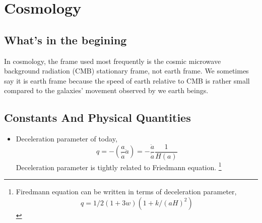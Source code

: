 \documentclass[11pt]{book}
\begin{document}
\chapter{Cosmology}


\section{What's in the begining}

In cosmology, the frame used most frequently is the cosmic microwave background radiation (CMB) stationary frame,  not earth frame. We sometimes say it is earth frame because the speed of earth relative to CMB is rather small compared to the galaxies' movement observed by we earth beings.



\section{Constants And Physical Quantities}

\begin{itemize}
\item
Deceleration parameter of today, 
\[q=-\left( \frac{a}{\dot a}\ddot a \right)=-\frac{\ddot a}{\dot a}\frac{1}{H(a)}\]
Deceleration parameter is tightly related to Friedmann equation.
\footnote{Firedmann equation can be written in terms of deceleration parameter,\[q=1/2(1+3w)(1+k/(aH)^2)\]}


\end{itemize}
\end{document}
